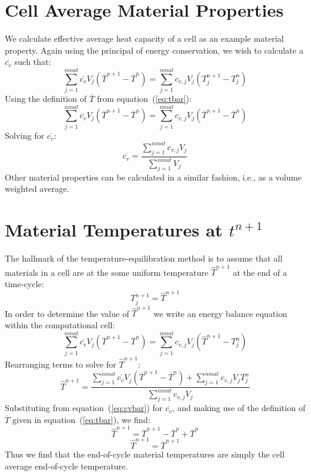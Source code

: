 \documentclass[12pt]{article}
\begin{document}
\section{Cell Average Material Properties}

We calculate  effective average heat capacity of a cell as an example
material property. Again using the principal of energy conservation, 
we wish to calculate a $\overline{c_{v}}$ such that:
\begin{equation}
\sum_{j=1}^{nmat} \overline{c_{v}}  V_{j} (\overline{T}^{n+1}-\overline{T}^{n})   = 
\sum_{j=1}^{nmat} c_{v,j} V_{j} (T_{j}^{n+1}-T_{j}^{n})
\end{equation}
Using the definition of $\overline{T}$ from equation~(\ref{eq:tbar}):
\begin{equation}
\sum_{j=1}^{nmat}  \overline{c_{v}} V_{j}  
(\overline{T}^{n+1}-\overline{T}^{n})   = 
 \sum_{j=1}^{nmat} c_{v,j} V_{j} (\overline{T}^{n+1}-\overline{T}^{n})
\end{equation}
Solving for $\overline{c_{v}}$:
\begin{equation}
\overline{c_{v}} = \frac{ \sum_{j=1}^{nmat} c_{v,j} V_{j} } 
{\sum_{j=1}^{nmat} V_{j}}
\label{eq:cvbar}
\end{equation}
Other material properties can be calculated in a similar fashion, i.e.,
as a volume weighted average.

\section{Material Temperatures at $t^{n+1}$}

The hallmark of the temperature-equilibration method is to assume
that all materials in a cell are at the some uniform temperature 
$\widehat{T}^{n+1}$
at the end of a time-cycle:
\begin{equation}
T_{j}^{n+1} = \widehat{T}^{n+1}
\end{equation}
In order to determine the value of $\widehat{T}^{n+1}$ 
we write an energy balance equation within the computational cell:
\begin{equation}
 \sum_{j=1}^{nmat} \overline{c_{v}} V_{j} 
(\overline{T}^{n+1}-\overline{T}^{n}) = 
\sum_{j=1}^{nmat} c_{v,j} V_{j} (\widehat{T}^{n+1} - T_{j}^{n})
\end{equation}
Rearranging terms to solve for $\widehat{T}^{n+1}$:
\begin{equation}
\widehat{T}^{n+1} = \frac{ \sum_{j=1}^{nmat} \overline{c_{v}} V_{j}    
(\overline{T}^{n+1}-\overline{T}^{n}) +
\sum_{j=1}^{nmat} c_{v,j} V_{j} T_{j}^{n} }
{\sum_{j=1}^{nmat} c_{v,j}V_{j}}
\end{equation}
Substituting from equation~(\ref{eq:cvbar}) for $\overline{c_{v}}$, and
making use of the definition of $\overline{T}$ given in 
equation~(\ref{eq:tbar}), we find:
\begin{equation}
\widehat{T}^{n+1} = \overline{T}^{n+1} - \overline{T}^{n} + \overline{T}^{n}
\end{equation}
\begin{equation}
\widehat{T}^{n+1} = \overline{T}^{n+1}
\end{equation}
Thus we find that the end-of-cycle material temperatures are simply the cell
average end-of-cycle temperature.
\end{document}
